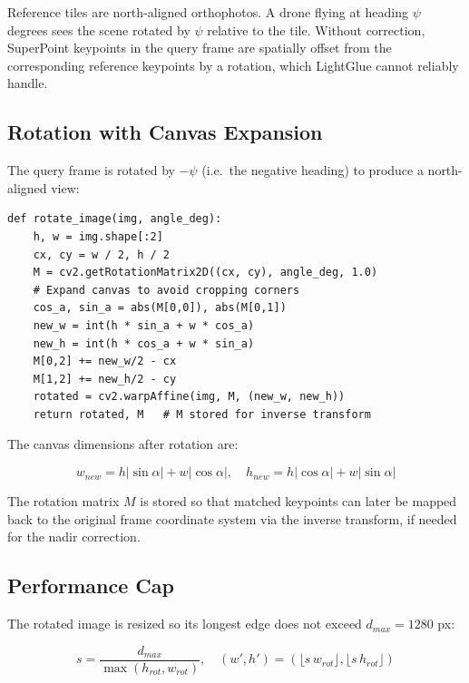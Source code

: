 \documentclass[12pt,a4paper]{article}
\begin{document}
Reference tiles are north-aligned orthophotos. A drone flying at heading
$\psi$ degrees sees the scene rotated by $\psi$ relative to the tile. Without
correction, SuperPoint keypoints in the query frame are spatially offset from
the corresponding reference keypoints by a rotation, which LightGlue cannot
reliably handle.

\subsection{Rotation with Canvas Expansion}

The query frame is rotated by $-\psi$ (i.e.\ the negative heading) to produce
a north-aligned view:

\begin{lstlisting}[caption={Heading rotation (visual\_measurement.py).}]
def rotate_image(img, angle_deg):
    h, w = img.shape[:2]
    cx, cy = w / 2, h / 2
    M = cv2.getRotationMatrix2D((cx, cy), angle_deg, 1.0)
    # Expand canvas to avoid cropping corners
    cos_a, sin_a = abs(M[0,0]), abs(M[0,1])
    new_w = int(h * sin_a + w * cos_a)
    new_h = int(h * cos_a + w * sin_a)
    M[0,2] += new_w/2 - cx
    M[1,2] += new_h/2 - cy
    rotated = cv2.warpAffine(img, M, (new_w, new_h))
    return rotated, M   # M stored for inverse transform
\end{lstlisting}

The canvas dimensions after rotation are:

\begin{equation}
    w_{new} = h|\sin\alpha| + w|\cos\alpha|, \quad
    h_{new} = h|\cos\alpha| + w|\sin\alpha|
    \label{eq:canvas_size}
\end{equation}

The rotation matrix $M$ is stored so that matched keypoints can later be
mapped back to the original frame coordinate system via the inverse transform,
if needed for the nadir correction.

\subsection{Performance Cap}

The rotated image is resized so its longest edge does not exceed
$d_{max} = 1280$ px:

\begin{equation}
    s = \frac{d_{max}}{\max(h_{rot}, w_{rot})}, \quad
    (w', h') = (\lfloor s\,w_{rot}\rfloor, \lfloor s\,h_{rot}\rfloor)
    \label{eq:resize}
\end{equation}
\end{document}
